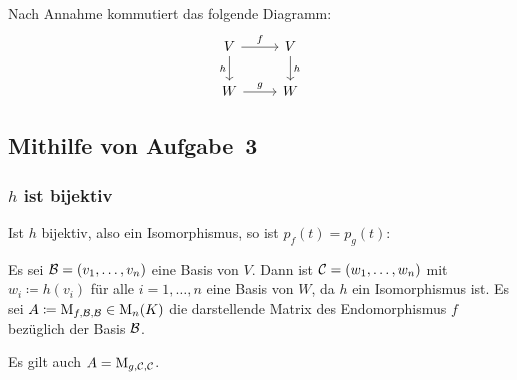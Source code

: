 \section{}

Nach Annahme kommutiert das folgende Diagramm:
\begin{equation}
  \label{diagram: given one}
  \begin{tikzcd}
      V
      \arrow{r}{f}
      \arrow[swap]{d}{h}
    & V
      \arrow{d}{h}
    \\
      W
      \arrow{r}{g}
    & W
  \end{tikzcd}
\end{equation}





\subsection*{Mithilfe von Aufgabe~3}



\subsubsection*{$h$ ist bijektiv}

Ist $h$ bijektiv, also ein Isomorphismus, so ist $p_f(t) = p_g(t)$:

Es sei $\mathcal{B} = (v_1, \dotsc, v_n)$ eine Basis von $V$.
Dann ist $\mathcal{C} = (w_1, \dotsc, w_n)$ mit $w_i \coloneqq h(v_i)$ für alle $i = 1, \dotsc, n$ eine Basis von $W$, da $h$ ein Isomorphismus ist.
Es sei $A \coloneqq \operatorname{M}_{f, \mathcal{B}, \mathcal{B}} \in \operatorname{M}_{n}(K)$ die darstellende Matrix des Endomorphismus $f$ bezüglich der Basis $\mathcal{B}$.

\begin{claim}
  Es gilt auch $A = \operatorname{M}_{g, \mathcal{C}, \mathcal{C}}$.
\end{claim}

